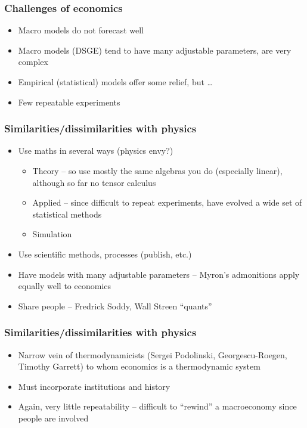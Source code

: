 \documentclass[final]{beamer}
\begin{document}
\begin{frame}
\frametitle{Challenges of economics}
\begin{itemize}
\item Macro models do not forecast well
\item Macro models (DSGE) tend to have many adjustable parameters, are very complex
\item Empirical (statistical) models offer some relief, but \ldots
\item Few repeatable experiments
\end{itemize}
\end{frame}

\begin{frame}
\frametitle{\textbf{Similarities}/dissimilarities with physics}
\begin{itemize}
\item Use maths in several ways (physics envy?)
	\begin{itemize}
	\item Theory -- so use mostly the same algebras you do (especially linear), although so far no tensor calculus
	\item Applied -- since difficult to repeat experiments, have evolved a wide set of statistical methods
	\item Simulation
	\end{itemize}
\item Use scientific methods, processes (publish, etc.)
\item Have models with many adjustable parameters -- Myron's admonitions apply equally well to economics
\item Share people -- Fredrick Soddy, Wall Streen ``quants''

\end{itemize}
\end{frame}

\begin{frame}
\frametitle{Similarities/\textbf{dissimilarities} with physics}
\begin{itemize}
\item Narrow vein of thermodynamicists (Sergei Podolinski, Georgescu-Roegen, Timothy Garrett) to whom economics is a thermodynamic system
\item Must incorporate institutions and history
\item Again, very little repeatability -- difficult to ``rewind'' a macroeconomy since people are involved
\end{itemize}
\end{frame}
\end{document}
